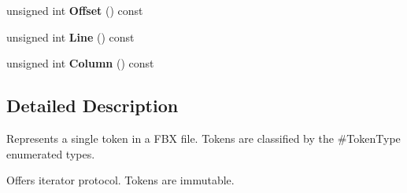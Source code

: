 \begin{DoxyCompactItemize}
\item 
\hypertarget{class_assimp_1_1_f_b_x_1_1_token_a1806ee00307c9ba1b3d2fa6cfcae3a31}{unsigned int {\bfseries Offset} () const }\label{class_assimp_1_1_f_b_x_1_1_token_a1806ee00307c9ba1b3d2fa6cfcae3a31}

\item 
\hypertarget{class_assimp_1_1_f_b_x_1_1_token_a2f99eb6b24da1909c88ca5da8b85c385}{unsigned int {\bfseries Line} () const }\label{class_assimp_1_1_f_b_x_1_1_token_a2f99eb6b24da1909c88ca5da8b85c385}

\item 
\hypertarget{class_assimp_1_1_f_b_x_1_1_token_aaf36d7912383dd11375d2da184c1d6fc}{unsigned int {\bfseries Column} () const }\label{class_assimp_1_1_f_b_x_1_1_token_aaf36d7912383dd11375d2da184c1d6fc}

\end{DoxyCompactItemize}


\subsection{Detailed Description}
Represents a single token in a F\+B\+X file. Tokens are classified by the \#\+Token\+Type enumerated types.

Offers iterator protocol. Tokens are immutable. 

